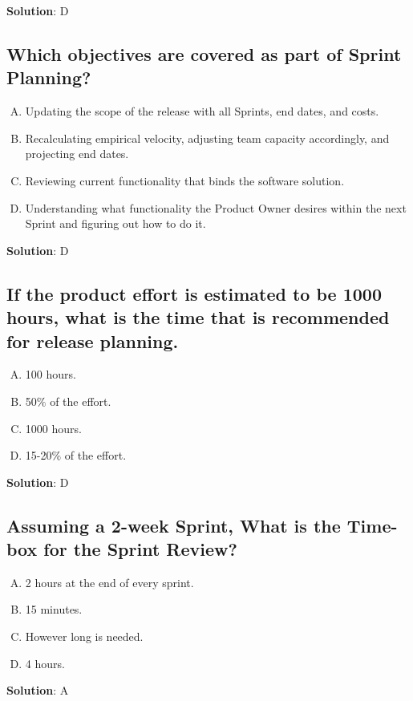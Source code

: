 \textbf{Solution}: D


\subsection{Which objectives are covered as part of Sprint Planning?}
\begin{enumerate}[A)]
  \item Updating the scope of the release with all Sprints, end dates, and costs.
  \item Recalculating empirical velocity, adjusting team capacity accordingly, and projecting end dates.
  \item Reviewing current functionality that binds the software solution.
  \item Understanding what functionality the Product Owner desires within the next Sprint and figuring out how to do it.
\end{enumerate}

\textbf{Solution}: D


\subsection{If the product effort is estimated to be 1000 hours, what is the time that is recommended for release planning.}
\begin{enumerate}[A)]
  \item 100 hours.
  \item 50$\%$ of the effort.
  \item 1000 hours.
  \item 15-20$\%$ of the effort.
\end{enumerate}

\textbf{Solution}: D


\subsection{Assuming a 2-week Sprint, What is the Time-box for the Sprint Review?}
\begin{enumerate}[A)]
  \item 2 hours at the end of every sprint.
  \item 15 minutes.
  \item However long is needed.
  \item 4 hours.
\end{enumerate}


\textbf{Solution}: A


